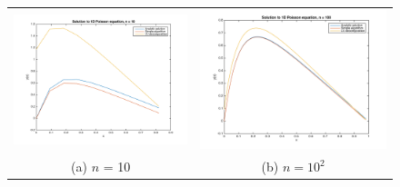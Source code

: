 \documentclass{article}
\begin{document}
\begin{multicols}{2}
\begin{figure}
\begin{center}
\begin{tabular}{cc}
  	\includegraphics[width=90mm]{../build-Project1-Desktop_Qt_5_5_0_clang_64bit-Debug/Plot_n10.png} 	
	& \includegraphics[width=90mm]{../build-Project1-Desktop_Qt_5_5_0_clang_64bit-Debug/Plot_n100.png} \\
	
	(a) $n$ = 10 								& (b) $n = 10^2$ \\[6pt]
	

\end{tabular}
\end{center}
\end{figure}
\end{multicols}
\end{document}
